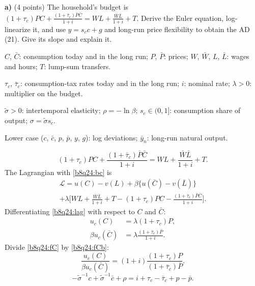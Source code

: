 \textbf{a)} (4 points) The household's budget is $(1+\tau_c)PC+\frac{(1+\bar\tau_c)\bar P\bar C}{1+i}=WL+\frac{\bar W\bar L}{1+i}+T$. Derive the Euler equation,
log-linearize it, and use $y=s_cc+g$ and long-run price flexibility to obtain the AD (21). Give its slope and explain it.
\resolespaco
\begin{sol}
\begin{notacao}
\item $C$, $\bar C$: consumption today and in the long run; $P$, $\bar P$: prices; $W$, $\bar W$, $L$, $\bar L$: wages and hours; $T$: lump-sum transfers.
\item $\tau_c$, $\bar\tau_c$: consumption-tax rates today and in the long run; $i$: nominal rate; $\lambda>0$: multiplier on the budget.
\item $\tilde\sigma>0$: intertemporal elasticity; $\rho=-\ln\beta$; $s_c\in(0,1]$: consumption share of output; $\sigma=\tilde\sigma s_c$.
\item Lower case ($c$, $\bar c$, $p$, $\bar p$, $y$, $g$): log deviations; $\bar y_n$: long-run natural output.
\end{notacao}
\begin{equation}
(1+\tau_c)PC+\frac{(1+\bar\tau_c)\bar P\bar C}{1+i}=WL+\frac{\bar W\bar L}{1+i}+T. \label{b8q24:bc}
\end{equation}
The Lagrangian with \eqref{b8q24:bc} is
\begin{multline}
\mathcal L=u(C)-v(L)+\beta\{u(\bar C)-v(\bar L)\}\\
+\lambda\Big[WL+\frac{\bar W\bar L}{1+i}+T-(1+\tau_c)PC-\frac{(1+\bar\tau_c)\bar P\bar C}{1+i}\Big]. \label{b8q24:lag}
\end{multline}
Differentiating \eqref{b8q24:lag} with respect to $C$ and $\bar C$:
\begin{align}
u_c(C)&=\lambda(1+\tau_c)P, \label{b8q24:fC}\\
\beta u_c(\bar C)&=\lambda\frac{(1+\bar\tau_c)\bar P}{1+i}. \label{b8q24:fCb}
\end{align}
Divide \eqref{b8q24:fC} by \eqref{b8q24:fCb}:
\begin{equation}
\frac{u_c(C)}{\beta u_c(\bar C)}=(1+i)\frac{(1+\tau_c)P}{(1+\bar\tau_c)\bar P}. \label{b8q24:euler}
\end{equation}
\begin{equation}
-\tilde\sigma^{-1}c+\tilde\sigma^{-1}\bar c+\rho=i+\tau_c-\bar\tau_c+p-\bar p. \label{b8q24:logeu}

\end{equation}
\end{sol}

